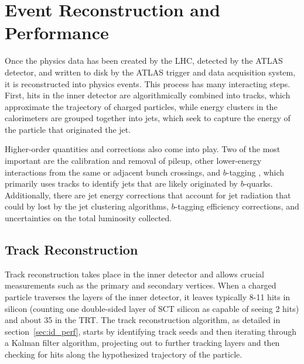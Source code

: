  

\chapter[Reconstruction and Performance]{Event Reconstruction and Performance}
Once the physics data has been created by the LHC, detected by the ATLAS detector, and written to 
disk by the ATLAS trigger and data acquisition system, it is reconstructed into physics events.  This process has 
many interacting steps.  First, hits in the inner detector are algorithmically combined into tracks, which approximate the 
trajectory of charged particles, while energy clusters in the calorimeters are grouped together into jets, which seek to 
capture the energy of the particle that originated the jet.  

Higher-order quantities and corrections also come into play.  Two of the most important are the calibration and removal of 
pileup, other lower-energy interactions from the same or adjacent bunch crossings, and $b$-tagging
, which primarily uses tracks to identify jets that are likely originated by $b$-quarks.  Additionally, 
there are jet energy corrections that account for jet radiation that could by lost by the jet clustering algorithms, 
$b$-tagging efficiency corrections, and uncertainties on the total luminosity collected. 



\section{Track Reconstruction}
\label{sec:trk_reco}
Track reconstruction takes place in the inner detector and allows crucial measurements such as the primary and secondary vertices.  
When a charged particle traverses the layers of the inner detector, it leaves typically 8-11 hits in 
silicon (counting one double-sided layer of SCT silicon as capable of seeing 2 hits) and about 
35 in the TRT.  The track reconstruction algorithm, as detailed in section~\ref{sec:id_perf}, 
starts by identifying track seeds and then iterating through a Kalman filter algorithm, projecting out to further tracking layers 
and then checking for hits along the hypothesized trajectory of the particle.  

